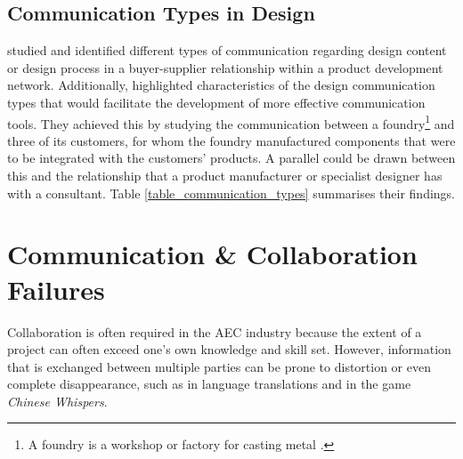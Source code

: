 
\subsection{Communication Types in Design}

\cite{Holtta} studied and identified different types of communication regarding design content or design process in a buyer-supplier relationship within a product development network.
Additionally, \citeauthor{Holtta} highlighted characteristics of the design communication types that would facilitate the development of more effective communication tools.
They achieved this by studying the communication between a foundry\footnote{A foundry is a workshop or factory for casting metal \citep{foundry:oxford}.} and three of its customers, for whom the foundry manufactured components that were to be integrated with the customers' products.
A parallel could be drawn between this and the relationship that a product manufacturer or specialist designer has with a consultant.
Table \ref{table_communication_types} summarises their findings.




\section{Communication \& Collaboration Failures}


Collaboration is often required in the AEC industry because the extent of a project can often exceed one's own knowledge and skill set.
However, information that is exchanged between multiple parties can be prone to distortion or even complete disappearance, such as in language translations and in the game \textit{Chinese Whispers}.

